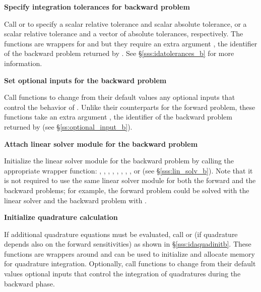 \begin{Steps}
\item 
  {\bf Specify integration tolerances for backward problem}
  
  Call  or 
  to specify a scalar relative tolerance and scalar absolute tolerance, or a
  scalar relative tolerance and a vector of absolute tolerances, respectively.
  The functions are wrappers for  and
   but they require an extra argument ,
  the identifier of the backward problem returned by .
  See \S\ref{sss:idatolerances_b} for more information.


\item
  {\bf Set optional inputs for the backward problem}

  Call  functions to change from their default values
  any optional inputs that control the behavior of {\idas}. Unlike
  their counterparts for the forward problem, these functions take an
  extra argument , the identifier of the backward problem returned 
  by  (see \S\ref{ss:optional_input_b}).


\item \label{i:lin_solverB}
  {\bf Attach linear solver module for the backward problem}

  Initialize the linear solver module 
  for the backward problem by calling the appropriate wrapper
  function: , , , ,
  , , , , or
   (see \S\ref{sss:lin_solv_b}).  
  Note that it is not required to use the same linear solver module for both the forward 
  and the backward problems; for example, the forward problem could be solved
  with the {\idadense} linear solver and the backward problem with {\idaspgmr}.

\item \label{i:quadB}
  {\bf Initialize quadrature calculation}

  If additional quadrature equations must be evaluated, 
  call  or  (if quadrature depends also on the
  forward sensitivities) as shown in \S\ref{sss:idaquadinitb}. These functions are
  wrappers around  and can be used to initialize and allocate 
  memory for quadrature integration. Optionally, call  functions 
  to change from their default values optional inputs that control the integration 
  of quadratures during the backward phase.


\end{Steps}
